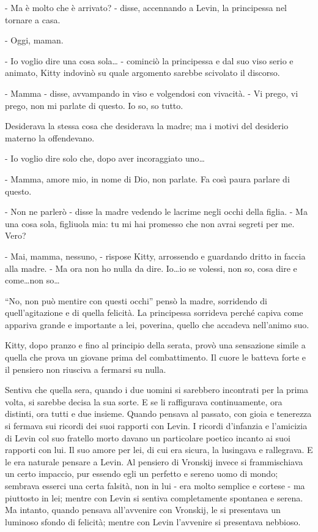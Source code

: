 - Ma è molto che è arrivato? - disse, accennando a Levin, la principessa nel tornare a casa. 

- Oggi, maman. 

- Io voglio dire una cosa sola\ldots{} - cominciò la principessa e dal suo viso serio e animato, Kitty indovinò su quale argomento sarebbe scivolato il discorso. 

- Mamma - disse, avvampando in viso e volgendosi con vivacità. - Vi prego, vi prego, non mi parlate di questo. Io so, so tutto. 

Desiderava la stessa cosa che desiderava la madre; ma i motivi del desiderio materno la offendevano. 

- Io voglio dire solo che, dopo aver incoraggiato uno\ldots{} 

- Mamma, amore mio, in nome di Dio, non parlate. Fa così paura parlare di questo. 

- Non ne parlerò - disse la madre vedendo le lacrime negli occhi della figlia. - Ma una cosa sola, figliuola mia: tu mi hai promesso che non avrai segreti per me. Vero? 

- Mai, mamma, nessuno, - rispose Kitty, arrossendo e guardando dritto in faccia alla madre. - Ma ora non ho nulla da dire. Io\ldots{}io se volessi, non so, cosa dire e come\ldots{}non so\ldots{} 

``No, non può mentire con questi occhi'' pensò la madre, sorridendo di quell'agitazione e di quella felicità. La principessa sorrideva perché capiva come appariva grande e importante a lei, poverina, quello che accadeva nell'animo suo. 

Kitty, dopo pranzo e fino al principio della serata, provò una sensazione simile a quella che prova un giovane prima del combattimento. Il cuore le batteva forte e il pensiero non riusciva a fermarsi su nulla. 

Sentiva che quella sera, quando i due uomini si sarebbero incontrati per la prima volta, si sarebbe decisa la sua sorte. E se li raffigurava continuamente, ora distinti, ora tutti e due insieme. Quando pensava al passato, con gioia e tenerezza si fermava sui ricordi dei suoi rapporti con Levin. I ricordi d'infanzia e l'amicizia di Levin col suo fratello morto davano un particolare poetico incanto ai suoi rapporti con lui. Il suo amore per lei, di cui era sicura, la lusingava e rallegrava. E le era naturale pensare a Levin. Al pensiero di Vronskij invece si frammischiava un certo impaccio, pur essendo egli un perfetto e sereno uomo di mondo; sembrava esserci una certa falsità, non in lui - era molto semplice e cortese - ma piuttosto in lei; mentre con Levin si sentiva completamente spontanea e serena. Ma intanto, quando pensava all'avvenire con Vronskij, le si presentava un luminoso sfondo di felicità; mentre con Levin l'avvenire si presentava nebbioso. 

